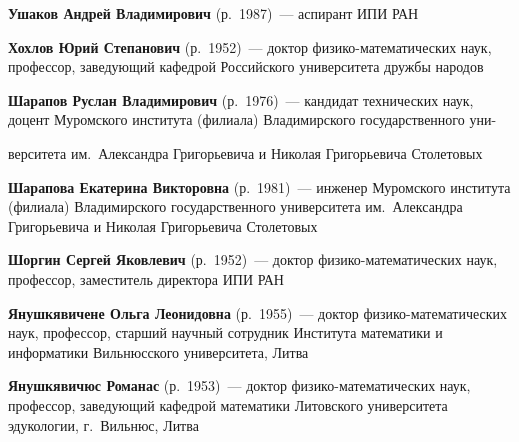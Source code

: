 \begin{multicols}{2}
\vspace*{3pt}

\noindent
\textbf{Ушаков Андрей Владимирович} (р.\ 1987)~--- аспирант ИПИ РАН

\vspace*{3pt}

\noindent
\textbf{Хохлов Юрий Степанович} (р.\ 1952)~--- доктор фи\-зи\-ко-ма\-те\-ма\-ти\-че\-ских наук, 
профессор, заведующий кафедрой Российского университета дружбы народов

\vspace*{3pt}

\noindent
\textbf{Шарапов Руслан Владимирович} (р.\ 1976)~--- кандидат технических наук, 
доцент Муромского института (филиала) Владимирского государственного уни-\linebreak\vspace*{-12pt}

\columnbreak

\noindent
верситета им.\
Александра Григорьевича и Николая Григорьевича Столетовых


\vspace*{5pt}

\noindent
\textbf{Шарапова Екатерина Викторовна} (р.\ 1981)~--- инженер Муромского института (филиала) 
Владимирского государственного университета им.\ 
Александра Григорьевича и Николая Григорьевича \mbox{Столетовых}

\vspace*{5pt}

\noindent
\textbf{Шоргин Сергей Яковлевич} (р.\ 1952)~--- доктор 
фи\-зи\-ко-математических наук, профессор, заместитель директора ИПИ РАН 

\vspace*{5pt}

\noindent
\textbf{Янушкявичене Ольга Леонидовна}  (р.\ 1955)~--- доктор фи\-зи\-ко-математических наук, 
профессор,  старший научный сотрудник Института математики и информатики Вильнюсского 
университета, Литва

\vspace*{5pt}

\noindent
\textbf{Янушкявичюс Романас}  (р.\ 1953)~---  доктор фи\-зи\-ко-ма\-те\-ма\-тических наук, профессор,
заведующий кафедрой математики Литовского университета эдукологии, г.\ Вильнюс, Литва


\def\leftfootline{\small{\textbf{\thepage}
\hfill ИНФОРМАТИКА И ЕЁ ПРИМЕНЕНИЯ\ \ \ том~6\ \ \ выпуск~3\ \ \ 2012}
}%
 \def\rightfootline{\small{ИНФОРМАТИКА И ЕЁ ПРИМЕНЕНИЯ\ \ \ том~6\ \ \ выпуск~3\ \ \ 2012
\hfill \textbf{\thepage}}}


\end{multicols}

\newpage